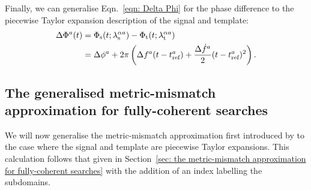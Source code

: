 \documentclass[../full_thesis/full_thesis.tex]{subfiles}
\begin{document}
Finally, we can generalise Eqn.~\eqref{eqn: Delta Phi} for the phase difference
to the piecewise Taylor expansion description of the signal and template:
\begin{align}
\Delta\Phi^{a}(t)& =  \Phi_{\textrm{s}}(t; {\lambda}_\textrm{s}^{\alpha a}) - \Phi_{\textrm{t}}(t; {\lambda}_\textrm{t}^{\alpha a})\\
& = \Delta\phi^{a} + 2\pi\left(\Delta f^{a}(t-t_{\textrm{ref}}^{a})
+ \frac{\Delta\dot{f}^{a}}{2}(t - t_{\textrm{ref}}^{a})^{2}\right).
\end{align}

\subsection{The generalised metric-mismatch approximation for fully-coherent
            searches}

We will now generalise the metric-mismatch approximation first introduced by
\citet{Brady1998} to the case where the signal and template are piecewise
Taylor expansions. This calculation follows that given in Section~\ref{sec: the
metric-mismatch approximation for fully-coherent searches} with the addition
of an index labelling the subdomains.
\end{document}
